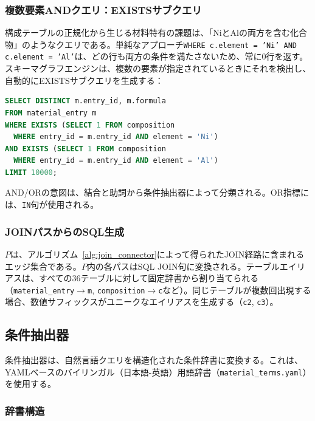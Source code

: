 \documentclass[twocolumn]{interact}
\begin{document}
\subsubsection{複数要素ANDクエリ：EXISTSサブクエリ}
\label{sec:multi_element}

構成テーブルの正規化から生じる材料特有の課題は、「NiとAlの両方を含む化合物」のようなクエリである。単純なアプローチ\texttt{WHERE c.element = 'Ni' AND c.element = 'Al'}は、どの行も両方の条件を満たさないため、常に0行を返す。スキーマグラフエンジンは、複数の要素が指定されているときにそれを検出し、自動的にEXISTSサブクエリを生成する：

\begin{lstlisting}[language=SQL,caption={複数要素AND},label=lst:exists,numbers=none]
SELECT DISTINCT m.entry_id, m.formula
FROM material_entry m
WHERE EXISTS (SELECT 1 FROM composition
  WHERE entry_id = m.entry_id AND element = 'Ni')
AND EXISTS (SELECT 1 FROM composition
  WHERE entry_id = m.entry_id AND element = 'Al')
LIMIT 10000;
\end{lstlisting}

AND/ORの意図は、結合と助詞から条件抽出器によって分類される。OR指標には、\texttt{IN}句が使用される。

\subsubsection{JOINパスからのSQL生成}

$P$は、アルゴリズム~\ref{alg:join_connector}によって得られたJOIN経路に含まれるエッジ集合である。$P$内の各パスはSQL JOIN句に変換される。テーブルエイリアスは、すべての36テーブルに対して固定辞書から割り当てられる（\texttt{material\_entry}$\to$\texttt{m}, \texttt{composition}$\to$\texttt{c}など）。同じテーブルが複数回出現する場合、数値サフィックスがユニークなエイリアスを生成する（\texttt{c2}, \texttt{c3}）。

\subsection{条件抽出器}

条件抽出器は、自然言語クエリを構造化された条件辞書に変換する。これは、YAMLベースのバイリンガル（日本語-英語）用語辞書（\texttt{material\_terms.yaml}）を使用する。

\subsubsection{辞書構造}
\end{document}
